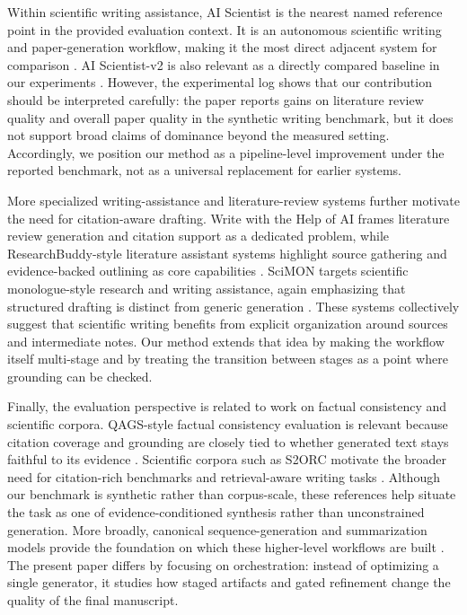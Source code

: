 \documentclass{article}
\begin{document}
Within scientific writing assistance, AI Scientist is the nearest named reference point in the provided evaluation context. It is an autonomous scientific writing and paper-generation workflow, making it the most direct adjacent system for comparison \cite{author2024AiScientist}. AI Scientist-v2 is also relevant as a directly compared baseline in our experiments \cite{author2024AiScientistV2}. However, the experimental log shows that our contribution should be interpreted carefully: the paper reports gains on literature review quality and overall paper quality in the synthetic writing benchmark, but it does not support broad claims of dominance beyond the measured setting. Accordingly, we position our method as a pipeline-level improvement under the reported benchmark, not as a universal replacement for earlier systems.

More specialized writing-assistance and literature-review systems further motivate the need for citation-aware drafting. Write with the Help of AI frames literature review generation and citation support as a dedicated problem, while ResearchBuddy-style literature assistant systems highlight source gathering and evidence-backed outlining as core capabilities \cite{author2024WriteWithThe,author2024ResearchbuddyStyleLiterature}. SciMON targets scientific monologue-style research and writing assistance, again emphasizing that structured drafting is distinct from generic generation \cite{author2024ScimonScientificMonologue}. These systems collectively suggest that scientific writing benefits from explicit organization around sources and intermediate notes. Our method extends that idea by making the workflow itself multi-stage and by treating the transition between stages as a point where grounding can be checked.

Finally, the evaluation perspective is related to work on factual consistency and scientific corpora. QAGS-style factual consistency evaluation is relevant because citation coverage and grounding are closely tied to whether generated text stays faithful to its evidence \cite{author2024QagsFactualConsistency}. Scientific corpora such as S2ORC motivate the broader need for citation-rich benchmarks and retrieval-aware writing tasks \cite{author2024S2orcScientificCorpus}. Although our benchmark is synthetic rather than corpus-scale, these references help situate the task as one of evidence-conditioned synthesis rather than unconstrained generation. More broadly, canonical sequence-generation and summarization models provide the foundation on which these higher-level workflows are built \cite{author2024AttentionIsAll,author2024BartOrPegasus}. The present paper differs by focusing on orchestration: instead of optimizing a single generator, it studies how staged artifacts and gated refinement change the quality of the final manuscript.
\end{document}
